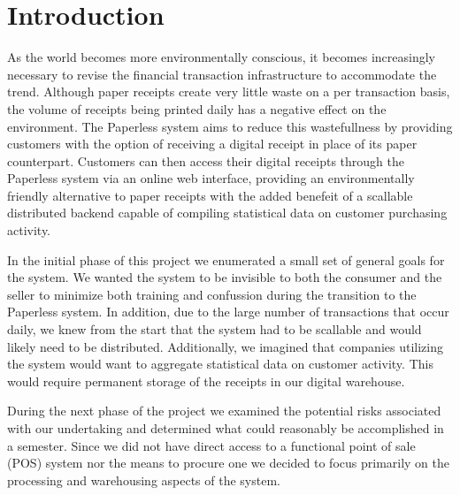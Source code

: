 \section{Introduction}
As the world becomes more environmentally conscious, it becomes
increasingly necessary to revise the financial transaction
infrastructure to accommodate the trend.  Although paper receipts
create very little waste on a per transaction basis, the volume of
receipts being printed daily has a negative effect on the environment.
The Paperless system aims to reduce this wastefullness by providing
customers with the option of receiving a digital receipt in place of
its paper counterpart.  Customers can then access their digital
receipts through the Paperless system via an online web interface,
providing an environmentally friendly alternative to paper receipts
with the added benefeit of a scallable distributed backend capable of
compiling statistical data on customer purchasing activity.

In the initial phase of this project we enumerated a small set of
general goals for the system.  We wanted the system to be invisible to
both the consumer and the seller to minimize both training and
confussion during the transition to the Paperless system.  In
addition, due to the large number of transactions that occur daily, we
knew from the start that the system had to be scallable and would
likely need to be distributed.  Additionally, we imagined that
companies utilizing the system would want to aggregate statistical
data on customer activity.  This would require permanent storage of
the receipts in our digital warehouse.

During the next phase of the project we examined the potential risks
associated with our undertaking and determined what could reasonably
be accomplished in a semester.  Since we did not have direct access to
a functional point of sale (POS) system nor the means to procure one
we decided to focus primarily on the processing and warehousing
aspects of the system. 

